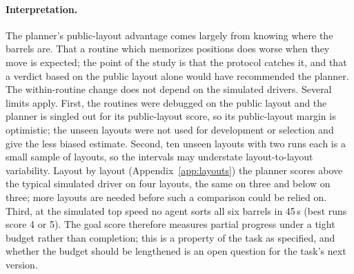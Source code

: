 \documentclass[11pt]{article}
\begin{document}
\paragraph{Interpretation.} The planner's public-layout advantage comes
largely from knowing where the barrels are. That a routine which memorizes positions does worse when
they move is expected; the point of the study is that the protocol catches it, and that a verdict
based on the public layout alone would have recommended the planner. The within-routine change does
not depend on the simulated drivers. Several limits apply. First, the routines were debugged on the public layout and the planner is
singled out for its public-layout score, so its public-layout margin is optimistic; the unseen
layouts were not used for development or selection and give the less biased estimate. Second, ten unseen layouts with two runs each is a small sample of layouts, so the
intervals may understate layout-to-layout variability. Layout by layout
(Appendix~\ref{app:layouts}) the planner scores above the typical simulated driver on four layouts,
the same on three and below on three; more layouts are needed before such a comparison could be
relied on. Third, at the
simulated top speed no agent sorts all six barrels in 45\,s (best runs score 4 or 5). The goal score
therefore measures partial progress under a tight budget rather than completion; this is a property
of the task as specified, and whether the budget should be lengthened is an open question for the
task's next version.

\begin{table}[t]
\centering\small
{}
\caption{\textbf{Where the points went} (simulated). What happened to each of the 120 barrels in an
agent's 20 runs: sorted (scores), never picked up, still carried when time ran out, or misplaced (in
the other zone or outside both). Re-grabs count pick-ups of a barrel the agent had already sorted.
Counted from the runs' final states and events (\texttt{paper/analysis/failure\_accounting.py});
no new runs.}
\label{tab:failures}
\end{table}
\end{document}
